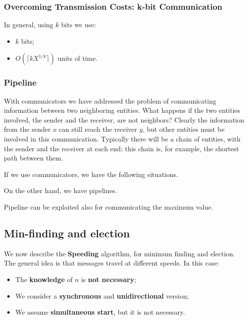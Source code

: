 \subsubsection{Overcoming Transmission Costs: k-bit Communication}
In general, using $k$ bits we use:
\begin{itemize}
    \item $k$ bits;
    \item $O(\lceil k X^{1/k} \rceil)$ units of time.
\end{itemize}

\subsubsection{Pipeline}
With communicators we have addressed the problem of communicating information between two neighboring entities. What happens if the two entities involved, the sender and the receiver, are not neighbors? Clearly the information from the sender $x$ can still reach the receiver $y$, but other entities must be involved in this communication. Typically there will be a chain of entities, with the sender and the receiver at each end; this chain is, for example, the shortest path between them.

If we use communicators, we have the following situations.

On the other hand, we have pipelines.


Pipeline can be exploited also for communicating the maximum value.


\subsection{Min-finding and election}
We now describe the \textbf{Speeding} algorithm, for minimum finding and election. The general idea is that messages travel at different speeds. In this case:
\begin{itemize}
    \item The \textbf{knowledge} of $n$ is \textbf{not necessary};
    \item We consider a \textbf{synchronous} and \textbf{unidirectional} version;
    \item We assume \textbf{simultaneous start}, but it is not necessary.
\end{itemize}

